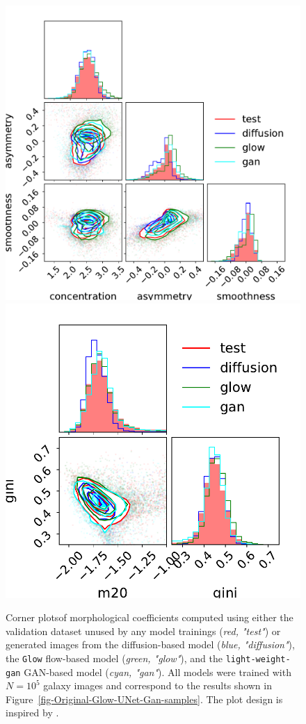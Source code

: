 \documentclass[fleqn,usenatbib]{mnras}
\begin{document}
\begin{figure}
    \centering
		\includegraphics[width=\linewidth]{fig-CAS-All_100000.pdf}\\
		\includegraphics[width=0.7\linewidth]{figures/fig-gini-m20-All_100000.pdf}
	\caption{Corner plots\protect\footnotemark of morphological coefficients computed using either the validation dataset unused by any model trainings (\textit{red, "test"}) or generated images from the diffusion-based model (\textit{blue, "diffusion"}), the \texttt{Glow} flow-based model (\textit{green, "glow"}), and the \texttt{light-weight-gan} GAN-based model (\textit{cyan, "gan"}). All models were trained with $N = 10^5$ galaxy images and correspond to the results shown in Figure~\ref{fig-Original-Glow-UNet-Gan-samples}. The plot design is inspired by \protect\cite{HACKSTEIN2023100685}.}
	\label{fig-morpho-coeff}
\end{figure}
\end{document}
